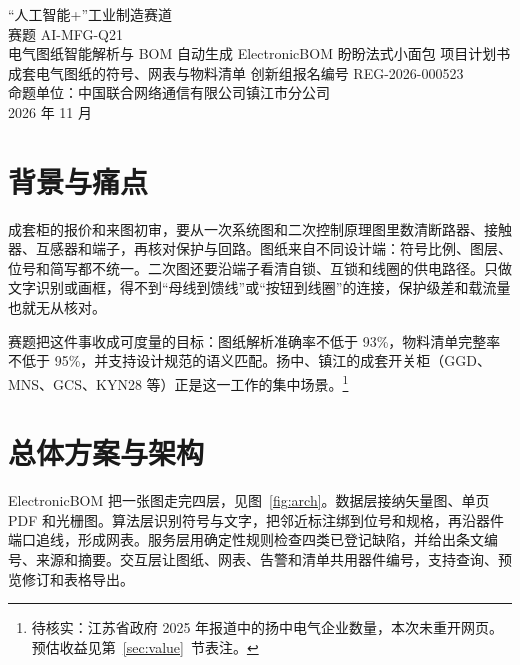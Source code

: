 

\contesttitlepage
  {“人工智能+”工业制造赛道\\赛题 AI-MFG-Q21\\电气图纸智能解析与 BOM 自动生成}
  {ElectronicBOM}
  {盼盼法式小面包}
  {项目计划书}
  {成套电气图纸的符号、网表与物料清单}
  {创新组\quad 报名编号 REG-2026-000523\\命题单位：中国联合网络通信有限公司镇江市分公司\\2026 年 11 月}

\begin{abstract}
ElectronicBOM 从一次系统图和二次控制图生成符号、规格、电气网表和物料清单，并标出四类已登记的合规问题。冻结主集 11 张图上，综合解析 97.88\%，严格明细完整率 96.92\%，平均 0.07 秒/张。
\end{abstract}

\section{背景与痛点}
成套柜的报价和来图初审，要从一次系统图和二次控制原理图里数清断路器、接触器、互感器和端子，再核对保护与回路。图纸来自不同设计端：符号比例、图层、位号和简写都不统一。二次图还要沿端子看清自锁、互锁和线圈的供电路径。只做文字识别或画框，得不到“母线到馈线”或“按钮到线圈”的连接，保护级差和载流量也就无从核对。

赛题把这件事收成可度量的目标：图纸解析准确率不低于 93\%，物料清单完整率不低于 95\%，并支持设计规范的语义匹配。扬中、镇江的成套开关柜（GGD、MNS、GCS、KYN28 等）正是这一工作的集中场景。\footnote{待核实：江苏省政府 2025 年报道中的扬中电气企业数量，本次未重开网页。预估收益见第~\ref{sec:value}~节表注。}

\section{总体方案与架构}
ElectronicBOM 把一张图走完四层，见图~\ref{fig:arch}。数据层接纳矢量图、单页 PDF 和光栅图。算法层识别符号与文字，把邻近标注绑到位号和规格，再沿器件端口追线，形成网表。服务层用确定性规则检查四类已登记缺陷，并给出条文编号、来源和摘要。交互层让图纸、网表、告警和清单共用器件编号，支持查询、预览修订和表格导出。

